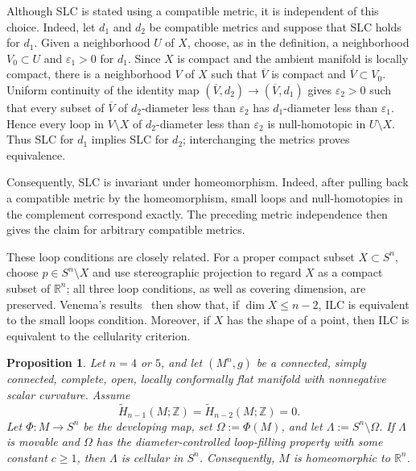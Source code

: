 \documentclass[12pt,oneside,a4paper]{article}
\newtheorem{proposition}[definition]{Proposition}
\theoremstyle{mytheorem}
\theoremstyle{remark}
\theoremstyle{definition}
\begin{document}
Although SLC is stated using a compatible metric, it is independent of this
choice. Indeed, let \(d_1\) and \(d_2\) be compatible metrics and suppose that
SLC holds for \(d_1\). Given a neighborhood \(U\) of \(X\), choose, as in the
definition, a neighborhood \(V_0\subset U\) and \(\varepsilon_1>0\) for
\(d_1\). Since \(X\) is compact and the ambient manifold is locally compact,
there is a neighborhood \(V\) of \(X\) such that
\(\overline V\) is compact and \(\overline V\subset V_0\). Uniform continuity
of the identity map
\((\overline V,d_2)\to(\overline V,d_1)\) gives \(\varepsilon_2>0\) such that
every subset of \(\overline V\) of \(d_2\)-diameter less than
\(\varepsilon_2\) has \(d_1\)-diameter less than \(\varepsilon_1\). Hence every
loop in \(V\setminus X\) of \(d_2\)-diameter less than \(\varepsilon_2\) is
null-homotopic in \(U\setminus X\). Thus SLC for \(d_1\) implies SLC for
\(d_2\); interchanging the metrics proves equivalence.

Consequently, SLC is invariant under homeomorphism. Indeed, after pulling back a
compatible metric by the homeomorphism, small loops and null-homotopies in the
complement correspond exactly. The preceding metric independence then gives the
claim for arbitrary compatible metrics.

These loop conditions are closely related. For a proper compact subset
\(X\subset S^n\), choose \(p\in S^n\setminus X\) and use stereographic
projection to regard \(X\) as a compact subset of \(\mathbb R^n\); all three
loop conditions, as well as covering dimension, are preserved. Venema's
results~\cite[p.~444]{zbMATH03519593} then show that, if
\(\dim X\leq n-2\), ILC is equivalent to the small loops condition. Moreover,
if \(X\) has the shape of a point, then ILC is equivalent to the cellularity
criterion.

\begin{proposition}\label{lower dim}
Let \(n=4\) or \(5\), and let \((M^n,g)\) be a connected, simply connected,
complete, open, locally conformally flat manifold with nonnegative scalar
curvature.
Assume
\[
\widetilde H_{n-1}(M;\mathbb Z)
=
\widetilde H_{n-2}(M;\mathbb Z)
=
0.
\]
Let \(\Phi\colon M\to S^n\) be the developing map, set
\(\Omega:=\Phi(M)\), and let
\(\Lambda:=S^n\setminus\Omega\). If \(\Lambda\) is movable and \(\Omega\)
has the diameter-controlled loop-filling property with some constant
\(c\geq1\), then \(\Lambda\) is cellular in \(S^n\). Consequently,
\(M\) is homeomorphic to \(\mathbb R^n\).
\end{proposition}
\end{document}
